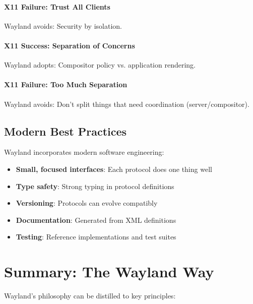 \paragraph{X11 Failure: Trust All Clients}
Wayland avoids: Security by isolation.

\paragraph{X11 Success: Separation of Concerns}
Wayland adopts: Compositor policy vs. application rendering.

\paragraph{X11 Failure: Too Much Separation}
Wayland avoids: Don't split things that need coordination (server/compositor).

\subsection{Modern Best Practices}

Wayland incorporates modern software engineering:

\begin{itemize}
    \item \textbf{Small, focused interfaces}: Each protocol does one thing well
    \item \textbf{Type safety}: Strong typing in protocol definitions
    \item \textbf{Versioning}: Protocols can evolve compatibly
    \item \textbf{Documentation}: Generated from XML definitions
    \item \textbf{Testing}: Reference implementations and test suites
\end{itemize}

\section{Summary: The Wayland Way}

Wayland's philosophy can be distilled to key principles:

